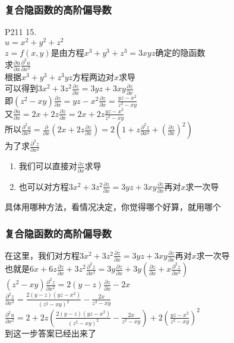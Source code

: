 \documentclass[xetex]{beamer}
\begin{document}
\begin{frame}
	\frametitle{复合隐函数的高阶偏导数}
	P211 15.\\
	$u=x^2+y^2+z^2$\\
	$z=f(x,y)$是由方程$x^3+y^3+z^3=3xyz$确定的隐函数\\
	求$\frac{\partial u}{\partial x}$\quad $\frac{\partial^2 u}{\partial x^2}$\\
	根据$x^3+y^3+z^3yz$\quad 方程两边对$x$求导\\
	可以得到$3x^2+3z^2\frac{\partial z}{\partial x}=3yz+3xy\frac{\partial z}{\partial x}$\\ \pause
	即$(z^2-xy)\frac{\partial z}{\partial x}=yz-x^2$\quad $\frac{\partial z}{\partial x}=\frac{yz-x^2}{z^2-xy}$\\
	又$\frac{\partial u}{\partial x}=2x+2z\frac{\partial z}{\partial x}=2x+2z\frac{yz-x^2}{z^2-xy}$\\ \pause
	所以$\frac{\partial^2 u}{\partial x^2}=\frac{\partial }{\partial x}(2x+2z\frac{\partial z}{\partial x})=2(1+z\frac{\partial^2 z}{\partial x^2}+(\frac{\partial z}{\partial x})^2)$\\ \pause
	为了求$\frac{\partial^2 z}{\partial x^2}$
	\begin{enumerate}
	\item 我们可以直接对$\frac{\partial z}{\partial x}$求导\\ \pause
	\item 也可以对方程$3x^2+3z^2\frac{\partial z}{\partial x}=3yz+3xy\frac{\partial z}{\partial x}$再对$x$求一次导\\ \pause
	\end{enumerate}
	具体用哪种方法，看情况决定，你觉得哪个好算，就用哪个\\
	
	
\end{frame}

\begin{frame}
	\frametitle{复合隐函数的高阶偏导数}
	在这里，我们对方程$3x^2+3z^2\frac{\partial z}{\partial x}=3yz+3xy\frac{\partial z}{\partial x}$再对$x$求一次导\\ \pause
	也就是$6x+6z\frac{\partial z}{\partial x}+3z^2\frac{\partial^2 z}{\partial x^2}=3y\frac{\partial z}{\partial x}+3y(\frac{\partial z}{\partial x}+x\frac{\partial^2 z}{\partial x^2})$\\ \pause
	$(z^2-xy)\frac{\partial^2 z}{\partial x^2}=2(y-z)\frac{\partial z}{\partial x}-2x$\\ \pause
	$\frac{\partial^2 z}{\partial x^2}=\frac{2(y-z)(yz-x^2)}{(z^2-xy)^2}-\frac{2x}{z^2-xy}$\\ \pause
	$\frac{\partial^2 u}{\partial x^2}=2+2z(\frac{2(y-z)(yz-x^2)}{(z^2-xy)^2}-\frac{2x}{z^2-xy})+2(\frac{yz-x^2}{z^2-xy})^2$\\ \pause
	到这一步\quad 答案已经出来了\\
\end{frame}
\end{document}
